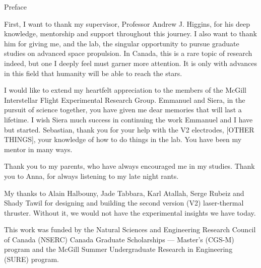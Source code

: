 \begin{plainchp}{Preface}
    \setcounter{page}{1}


    First, I want to thank my supervisor, Professor Andrew J. Higgins, for his deep knowledge, mentorship and support throughout this journey. I also want to thank him for giving me, and the lab, the singular opportunity to pursue graduate studies on advanced space propulsion. In Canada, this is a rare topic of research indeed, but one I deeply feel must garner more attention. It is only with advances in this field that humanity will be able to reach the stars.

    I would like to extend my heartfelt appreciation to the members of the McGill Interstellar Flight Experimental Research Group. Emmanuel and Siera, in the pursuit of science together, you have given me dear memories that will last a lifetime. I wish Siera much success in continuing the work Emmanuel and I have but started. Sebastian, thank you for your help with the V2 electrodes, [OTHER THINGS], your knowledge of how to do things in the lab. You have been my mentor in many ways.
    
    Thank you to my parents, who have always encouraged me in my studies. Thank you to Anna, for always listening to my late night rants.

    My thanks to Alain Halbouny, Jade Tabbara, Karl Atallah, Serge Rubeiz and Shady Tawil for designing and building the second version (V2) laser-thermal thruster. Without it, we would not have the experimental insights we have today.
    

    This work was funded by the Natural Sciences and Engineering Research Council of Canada (NSERC) Canada Graduate Scholarships — Master’s (CGS-M) program and the McGill Summer Undergraduate Research in Engineering (SURE) program.

\end{plainchp}